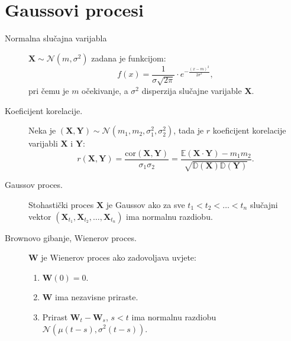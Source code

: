 \documentclass[12pt,english]{article}
\newcommand{\X}{\mathbf X}
\newcommand{\E}{\mathbb E}
\begin{document}
\section{Gaussovi procesi}
\begin{description}
  \item[Normalna slučajna varijabla] $\X \sim \mathcal N(m,\sigma^2)$ zadana je funkcijom:
  $$f(x)=\frac{1}{\sigma\sqrt{2\pi}}\cdot e^{-\frac{(x-m)^2}{2\sigma^2}},$$
  pri čemu je $m$ očekivanje, a $\sigma^2$ disperzija slučajne varijable $\X$.

  \item[Koeficijent korelacije.] Neka je $(\X,\mathbf Y) \sim \mathcal N(m_1,m_2,\sigma_1^2,\sigma_2^2)$, tada je $r$ koeficijent
  korelacije varijabli $\X$ i $\mathbf Y$:
  $$r(\X,\mathbf Y) = \frac{\mathrm{cor}(\X,\mathbf Y)}{\sigma_1 \sigma_2} = \frac{\E(\X \cdot \mathbf Y) - m_1 m_2}{\sqrt{\mathbb D(\X)\mathbb D(\mathbf Y)}}.$$

  \item[Gaussov proces.] Stohastički proces $\X$ je Gaussov ako za sve $t_1 < t_2 < \ldots < t_n$ slučajni vektor
  $(\X_{t_1},\X_{t_2},\ldots,\X_{t_n})$ ima normalnu razdiobu.

  \item[Brownovo gibanje, Wienerov proces.] $\mathbf W$ je Wienerov proces ako zadovoljava uvjete:
  \begin{enumerate}
    \item $\mathbf W(0) = 0$.
    \item $\mathbf W$ ima nezavisne priraste.
    \item Prirast $\mathbf W_t - \mathbf W_s$, $s<t$ ima normalnu razdiobu $\mathcal N(\mu(t-s),\sigma^2(t-s))$.
  \end{enumerate}
\end{description}
\end{document}
